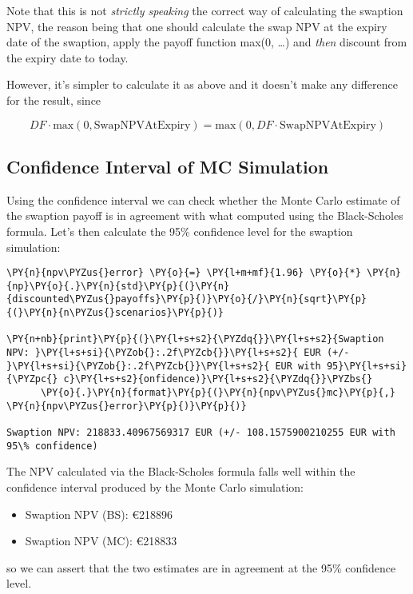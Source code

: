 Note that this is not \emph{strictly speaking} the correct way of
calculating the swaption NPV, the reason being that one should calculate
the swap NPV at the expiry date of the swaption, apply the payoff
function max(0, \ldots{}) and \emph{then} discount from the expiry date
to today.

However, it's simpler to calculate it as above and it doesn't make any
difference for the result, since

\[ DF\cdot \mathrm{max}(0, \mathrm{SwapNPVAtExpiry}) = \mathrm{max}(0, DF \cdot\mathrm{SwapNPVAtExpiry}) \]

\subsection{Confidence Interval of MC Simulation}

Using the confidence interval we can check whether the Monte Carlo estimate of the swaption payoff is in agreement with what computed using the Black-Scholes formula.
Let's then calculate the 95\% confidence level for the swaption simulation:

\begin{tcolorbox}[breakable, size=fbox, boxrule=1pt, pad at break*=1mm,colback=cellbackground, colframe=cellborder]
\begin{Verbatim}[commandchars=\\\{\}]
\PY{n}{npv\PYZus{}error} \PY{o}{=} \PY{l+m+mf}{1.96} \PY{o}{*} \PY{n}{np}\PY{o}{.}\PY{n}{std}\PY{p}{(}\PY{n}{discounted\PYZus{}payoffs}\PY{p}{)}\PY{o}{/}\PY{n}{sqrt}\PY{p}{(}\PY{n}{n\PYZus{}scenarios}\PY{p}{)}
				
\PY{n+nb}{print}\PY{p}{(}\PY{l+s+s2}{\PYZdq{}}\PY{l+s+s2}{Swaption NPV: }\PY{l+s+si}{\PYZob{}:.2f\PYZcb{}}\PY{l+s+s2}{ EUR (+/- }\PY{l+s+si}{\PYZob{}:.2f\PYZcb{}}\PY{l+s+s2}{ EUR with 95}\PY{l+s+si}{\PYZpc{} c}\PY{l+s+s2}{onfidence)}\PY{l+s+s2}{\PYZdq{}}\PYZbs{}
      \PY{o}{.}\PY{n}{format}\PY{p}{(}\PY{n}{npv\PYZus{}mc}\PY{p}{,} \PY{n}{npv\PYZus{}error}\PY{p}{)}\PY{p}{)}

Swaption NPV: 218833.40967569317 EUR (+/- 108.1575900210255 EUR with 95\% confidence)
\end{Verbatim}
\end{tcolorbox}

The NPV calculated via the Black-Scholes formula
falls well within the confidence interval produced by the Monte Carlo
simulation:

\begin{itemize}
\tightlist
\item
  Swaption NPV (BS): \euro{218896}
\item
  Swaption NPV (MC): \euro{218833}
\end{itemize}
so we can assert that the two estimates are in agreement at the 95\% confidence level.
